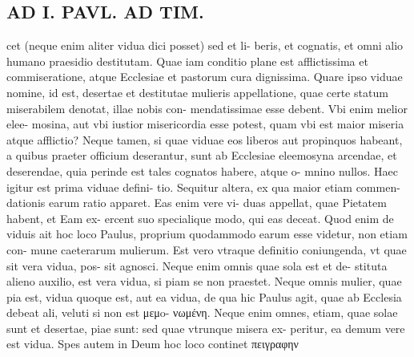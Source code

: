 \documentclass{article}
\begin{document}
\begin{pages}
\section*{AD I. PAVL. AD TIM. }
\marginpar{[ p.258 ]}\pstart cet (neque enim aliter vidua dici posset) sed et li- beris, et cognatis, et omni alio humano praesidio destitutam. Quae iam conditio plane est afflictissima et commiseratione, atque Ecclesiae et pastorum cura dignissima. Quare ipso viduae nomine, id est, desertae et destitutae mulieris appellatione, quae certe statum miserabilem denotat, illae nobis con- mendatissimae esse debent. Vbi enim melior elee- mosina, aut vbi iustior misericordia esse potest, quam vbi est maior miseria atque afflictio? Neque tamen, si quae viduae eos liberos aut propinquos habeant, a quibus praeter officium deserantur, sunt ab Ecclesiae eleemosyna arcendae, et deserendae, quia perinde est tales cognatos habere, atque o- mnino nullos. Haec igitur est prima viduae defini- tio. Sequitur altera, ex qua maior etiam commen- dationis earum ratio apparet. Eas enim vere vi- duas appellat, quae Pietatem habent, et Eam ex- ercent suo specialique modo, qui eas deceat. Quod enim de viduis ait hoc loco Paulus, proprium quodammodo earum esse videtur, non etiam con- mune caeterarum mulierum. Est vero vtraque definitio coniungenda, vt quae sit vera vidua, pos- sit agnosci. Neque enim omnis quae sola est et de- stituta alieno auxilio, est vera vidua, si piam se non praestet. Neque omnis mulier, quae pia est, vidua quoque est, aut ea vidua, de qua hic Paulus agit, quae ab Ecclesia debeat ali, veluti si non est μεμo- νωμένη. Neque enim omnes, etiam, quae solae sunt et desertae, piae sunt: sed quae vtrunque misera ex- peritur, ea demum vere est vidua. Spes autem in Deum hoc loco continet πειγραφην  \pend

\end{pages}
\end{document}
